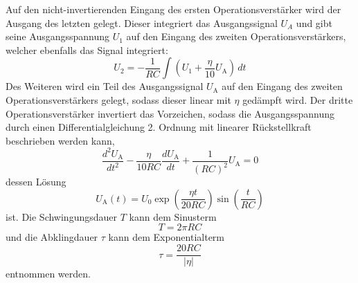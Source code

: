 Auf den nicht-invertierenden Eingang des ersten Operationsverstärker wird der
Ausgang des letzten gelegt.
Dieser integriert das Ausgangssignal $U_A$ und gibt seine Ausgangsspannung $U_1$ auf
den Eingang des zweiten Operationsverstärkers, welcher ebenfalls das Signal
integriert:
\begin{equation}
		\label{eq:ov2}
		U_2 = - \frac{1}{RC} \int \left( U_1 + \frac{\eta}{10} U_\text{A} \right) \, dt
\end{equation}
Des Weiteren wird ein Teil des Ausgangssignal $U_\text{A}$ auf den Eingang des
zweiten Operationsverstärkers gelegt, sodass dieser linear mit $\eta$ gedämpft wird.
Der dritte Operationsverstärker invertiert das Vorzeichen, sodass die
Ausgangsspannung durch einen Differentialgleichung 2. Ordnung mit linearer
Rückstellkraft beschrieben werden kann,
\begin{equation}
		\label{eq:schwingung_diff}
		\frac{d^2 U_\text{A}}{dt^2} - \frac{\eta}{10 R C} \frac{d
		U_\text{A}}{dt} + \frac{1}{(RC)^2} U_\text{A} = 0
\end{equation}
dessen Lösung
\begin{equation}
		U_\text{A}(t) = U_0 \exp \left( \frac{\eta t}{20 RC} \right)
    \sin \left(\frac{t}{RC}\right) \label{eq:tau}
\end{equation}
ist.
Die Schwingungsdauer $T$ kann dem Sinusterm
\begin{equation}\label{eq:T_theo}
	T = 2 \pi R C
\end{equation}
und die Abklingdauer $\tau$ kann dem
Exponentialterm
\begin{equation}\label{eq:tau_theo}
		\tau = \frac{20 R C}{|\eta|}
\end{equation}
entnommen werden.
